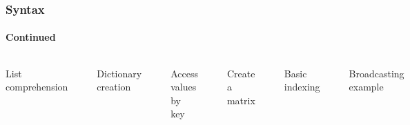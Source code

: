 \documentclass[aspectratio=169]{beamer} %
\begin{document}
  \begin{frame}[fragile]
    \frametitle{Syntax}
    \framesubtitle{Continued}

    \begin{columns}[t]
    List comprehension
    \begin{verbatim}
  squares = [i^2 for i in 1:5]
  \end{verbatim}
  
  Dictionary creation
  \begin{verbatim}
  person = Dict(
  "name" => "Alice",
  "age" => 30,
  "city" => "New York")
  \end{verbatim}
  Access values by key
  \begin{verbatim}
  person["name"])
    \end{verbatim}
    
  Create a matrix
\begin{verbatim}
  A = [1 2 3; 4 5 6; 7 8 9]
\end{verbatim}
Basic indexing
\begin{verbatim}
  element = A[2, 3]
  second_row = A[2, :]
  third_column = A[:, 3]
  submatrix = A[1:2, 2:3] 
\end{verbatim}
    Broadcasting example
    \begin{verbatim}
  A = [1 2 3; 4 5 6; 7 8 9]
  B = [2 2 2; 2 2 2; 2 2 2]
  C = A .+ B
  \end{verbatim}
    \end{columns}
    
    \end{frame}
\end{document}
